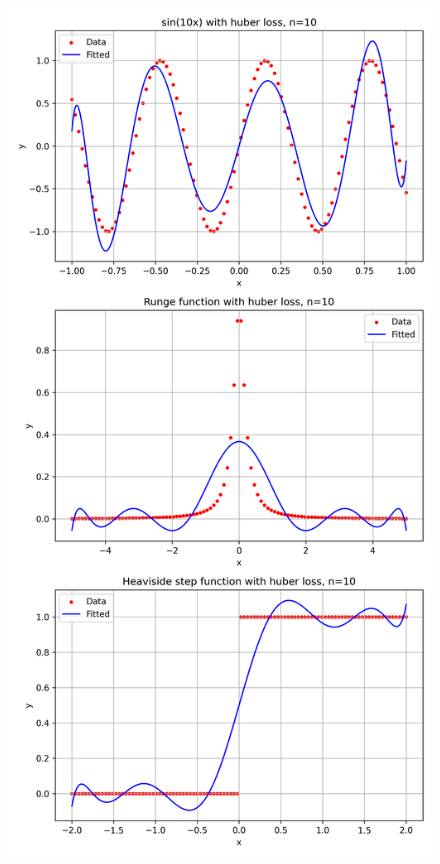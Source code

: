 \documentclass[a4paper,12pt]{article}
\begin{document}
\begin{figure}[b!]
    \centering
    
    \begin{minipage}{0.49\textwidth}
        \centering
        \includegraphics[width=\linewidth]{fig/compare_huber_loss.png}

\end{minipage}
\end{figure}
\end{document}
